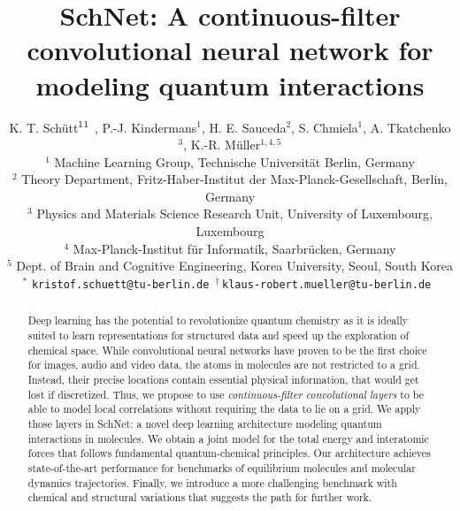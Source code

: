 \documentclass{article}
\title{SchNet: A continuous-filter convolutional neural network for modeling quantum interactions}
\author{
  K. T. Schütt$^1\footnotemark$ ,
  P.-J. Kindermans$^1$,
  H. E. Sauceda$^2$,
  S. Chmiela$^1$,
  A. Tkatchenko$^3$,
  K.-R. Müller$^{1,4,5}$\footnotemark \\
  $^1$ Machine Learning Group, Technische Universität Berlin, Germany \\
  $^2$ Theory Department, Fritz-Haber-Institut der Max-Planck-Gesellschaft, Berlin, Germany\\
  $^3$ Physics and Materials Science Research Unit, University of Luxembourg, Luxembourg\\
  $^4$ Max-Planck-Institut für Informatik, Saarbrücken, Germany\\
  $^5$ Dept. of Brain and Cognitive Engineering, Korea University, Seoul, South Korea\\
  $^*$ \tt{kristof.schuett@tu-berlin.de}
  $^\dagger\,$\tt{klaus-robert.mueller@tu-berlin.de}
}
\begin{document}
\maketitle


\begin{abstract}
Deep learning has the potential to revolutionize quantum chemistry as it is ideally suited to learn representations for structured data and speed up the exploration of chemical space.
While convolutional neural networks have proven to be the first choice for images, audio and video data, the atoms in molecules are not restricted to a grid.
Instead, their precise locations contain essential physical information, that would get lost if discretized.
Thus, we propose to use \textit{continuous-filter convolutional layers} to be able to model local correlations without requiring the data to lie on a grid.
We apply those layers in SchNet: a novel deep learning architecture modeling quantum interactions in molecules.
We obtain a joint model for the total energy and interatomic forces that follows fundamental quantum-chemical principles.
Our architecture achieves state-of-the-art performance for benchmarks of equilibrium molecules and molecular dynamics trajectories.
Finally, we introduce a more challenging benchmark with chemical and structural variations that suggests the path for further work.

%
%


\end{abstract}
\end{document}
